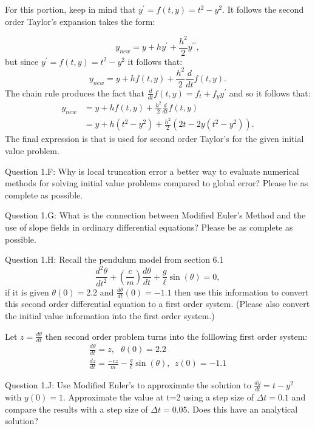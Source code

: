 \documentclass{article}
\def\ds{\displaystyle}
\begin{document}
{\color{teal} For this portion, keep in mind that $\ds y^ {\prime}=f(t,y) = t^2-y^2$. It follows the second order Taylor's expansion takes the form:

$$y_{new} = y + h y^{\prime}+ \frac {h^2}2 y^{\prime \prime}, $$ but since $\ds y^{\prime} = f(t,y) = t^2 -y^2$ it follows that:
$$y_{new} = y + h f(t,y)+ \frac {h^2}2 \frac d{dt}f(t,y).$$ 
The chain rule produces the fact that $\ds \frac d{dt}f(t,y) =  f_t + f_y y^{\prime}$ and so it follows that:
\begin{align*}
y_{new} &= y + h f(t,y)+ \frac {h^2}2 \frac d{dt}f(t,y) \\
  &= y + h (t^2-y^2)+ \frac {h^2}2 (2t -2y(t^2-y^2)) .
\end{align*}
The final expression is that is used for second order Taylor's for the given initial value problem. 
}
\medskip \par \noindent
%
Question 1.F: Why is local truncation error a better way to evaluate numerical methods for solving initial value problems compared to global error? Please be as complete as possible. 
\medskip \par \noindent
%
Question 1.G: What is the connection between Modified Euler's Method and the use of slope fields in ordinary differential equations? Please be as complete as possible. 
\medskip \par \noindent
%
Question 1.H: Recall the pendulum model from section 6.1
$$\frac {d^2 \theta}{dt^2} + \left (\frac cm\right )\frac {d\theta}{dt} + \frac g{\ell} \sin (\theta) = 0,$$
if it is given $\ds \theta (0)=2.2$ and $\ds \frac {d\theta}{dt}(0)=-1.1$ then use this information to convert this second order differential equation to a first order system. (Please also convert the initial value information into the first order system.) 

{\color{teal} Let $\ds z = \frac {d\theta}{dt}$ then second order problem turns into the folllowing first order system:
\begin{eqnarray*}
\frac {d \theta }{dt}   = z,  \ \ \  \theta(0) = 2.2\\
\frac {dz}{dt} = \frac {-c z}m - \frac g{\ell} \sin (\theta), \ \ z(0)=-1.1
\end{eqnarray*}}

\medskip \par \noindent
%
Question 1.J: Use Modified Euler's to approximate the solution to $\ds \frac {dy}{dt}=t-y^2$ with $y(0)=1$. Approximate the value at t=2 using a step size of $\ds \Delta t=0.1$ and compare the results with a step size of $\ds \Delta t=0.05$. Does this have an analytical solution?
\end{document}
